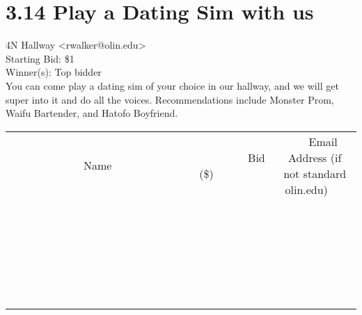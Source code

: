\documentclass[11pt]{article}
\begin{document}
					\section*{3.14 Play a Dating Sim with us}
					4N Hallway <rwalker@olin.edu> \\
					Starting Bid: \$1 \\
					Winner(s): Top bidder \\
					You can come play a dating sim of your choice in our hallway, and we will get super into it and do all the voices. Recommendations include Monster Prom, Waifu Bartender, and Hatofo Boyfriend. \\
					[6ex]
					\begin{tabular}{c c c}
						~~~~~~~~~~~~~Name~~~~~~~~~~~~~ & ~~~~~~~~~Bid (\$)~~~~~~~~~ & ~~~Email Address (if not standard olin.edu)~~~ \\
				
 & & \\
\hline
 & & \\
\hline
 & & \\
\hline
 & & \\
\hline
 & & \\
\hline
 & & \\
\hline
 & & \\
\hline
 & & \\
\hline
 & & \\
\hline
 & & \\
\hline
 & & \\
\hline
 & & \\
\hline
 & & \\
\hline
 & & \\
\hline
 & & \\
\hline
 & & \\
\hline
 & & \\
\hline
 & & \\
\hline
 & & \\
\hline
 & & \\
\hline
 & & \\
\hline
 & & \\
\hline
 & & \\
\hline
 & & \\
\hline
 & & \\
\hline
 & & \\
\hline
					\end{tabular}
					\clearpage
				
\end{document}
